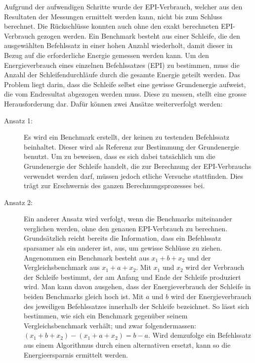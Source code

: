 Aufgrund der aufwendigen Schritte wurde der EPI-Verbrauch, welcher aus den Resultaten der Messungen ermittelt werden kann, nicht bis zum Schluss berechnet. Die Rückschlüsse konnten auch ohne den exakt berechneten EPI-Verbrauch gezogen werden. Ein Benchmark besteht aus einer Schleife, die den ausgewählten Befehlssatz in einer hohen Anzahl wiederholt, damit dieser in Bezug auf die erforderliche Energie gemessen werden kann. Um den Energieverbrauch eines einzelnen Befehlssatzes (EPI) zu bestimmen, muss die Anzahl der Schleifendurchläufe durch die gesamte Energie geteilt werden. Das Problem liegt darin, dass die Schleife selbst eine gewisse Grundenergie aufweist, die vom Endresultat abgezogen werden muss. Diese zu messen, stellt eine grosse Herausforderung dar. Dafür können zwei Ansätze weiterverfolgt werden:
\begin{description}
\item[Ansatz 1:]
Es wird ein Benchmark erstellt, der keinen zu testenden Befehlssatz beinhaltet. Dieser wird als Referenz zur Bestimmung der Grundenergie benutzt. Um zu beweisen, dass es sich dabei tatsächlich um die Grundenergie der Schleife handelt, die zur Berechnung der EPI-Verbrauchs verwendet werden darf, müssen jedoch etliche Versuche stattfinden. Dies trägt zur Erschwernis des ganzen Berechnungsprozesses bei. 
\par
\item[Ansatz 2:]
Ein anderer Ansatz wird verfolgt, wenn die Benchmarks miteinander verglichen werden, ohne den genauen EPI-Verbrauch zu berechnen. Grundsätzlich reicht bereits die Information, dass ein Befehlssatz sparsamer als ein anderer ist, aus, um gewisse Schlüsse zu ziehen. Angenommen ein Benchmark besteht aus $x_1 + b + x_2$ und der Vergleichsbenchmark aus $x_1 + a + x_2$. Mit $x_1$ und $x_2$ wird der Verbrauch der Schleife bestimmt, der am Anfang und Ende der Schleife produziert wird. Man kann davon ausgehen, dass der Energieverbrauch der Schleife in beiden Benchmarks gleich hoch ist. Mit $a$ und $b$ wird der Energieverbrauch des jeweiligen Befehlssatzes innerhalb der Schleife bezeichnet. So lässt sich bestimmen, wie sich ein Benchmark gegenüber seinem Vergleichsbenchmark verhält; und zwar folgendermassen: $(x_1 + b + x_2) - (x_1 + a + x_2) = b - a$. Wird demzufolge ein Befehlssatz aus einem Algorithmus durch einen alternativen ersetzt, kann so die Energieersparnis ermittelt werden.
\end{description}


